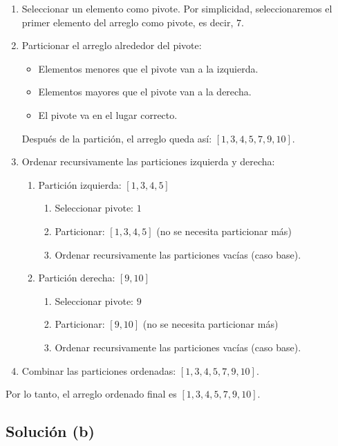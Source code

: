 \begin{enumerate}
    \item Seleccionar un elemento como pivote. Por simplicidad, seleccionaremos el primer elemento del arreglo como pivote, es decir, $7$.
    \item Particionar el arreglo alrededor del pivote:
        \begin{itemize}
            \item Elementos menores que el pivote van a la izquierda.
            \item Elementos mayores que el pivote van a la derecha.
            \item El pivote va en el lugar correcto.
        \end{itemize}
        Después de la partición, el arreglo queda así: $[1, 3, 4, 5, 7, 9, 10]$.
    \item Ordenar recursivamente las particiones izquierda y derecha:
        \begin{enumerate}
            \item Partición izquierda: $[1, 3, 4, 5]$
                \begin{enumerate}
                    \item Seleccionar pivote: $1$
                    \item Particionar: $[1, 3, 4, 5]$ (no se necesita particionar más)
                    \item Ordenar recursivamente las particiones vacías (caso base).
                \end{enumerate}
            \item Partición derecha: $[9, 10]$
                \begin{enumerate}
                    \item Seleccionar pivote: $9$
                    \item Particionar: $[9, 10]$ (no se necesita particionar más)
                    \item Ordenar recursivamente las particiones vacías (caso base).
                \end{enumerate}
        \end{enumerate}
    \item Combinar las particiones ordenadas: $[1, 3, 4, 5, 7, 9, 10]$.
\end{enumerate}

Por lo tanto, el arreglo ordenado final es $[1, 3, 4, 5, 7, 9, 10]$.

\subsection{Solución (b)}

